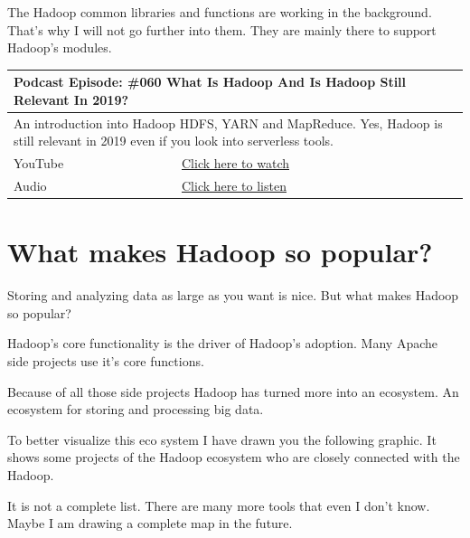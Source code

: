 \documentclass[12pt, numbers=noenddot]{scrreprt} %
\begin{document}
The Hadoop common libraries and functions are working in the background. That’s why I will not go further into them. They are mainly there to support Hadoop’s modules.

\begin{table}[h]
\begin{tabular}{ll}
\hline
\multicolumn{2}{l}{\textbf{Podcast Episode:} \#060 What Is Hadoop And Is Hadoop Still Relevant In 2019?} \\ \hline
\multicolumn{2}{p{15cm}}{An introduction into Hadoop HDFS, YARN and MapReduce. Yes, Hadoop is still relevant in 2019 even if you look into serverless tools. }         \\ \hline
\multicolumn{1}{l|}{YouTube}   & \href{https://youtu.be/8AWaht3YQgo}{Click here to watch}   \\
\multicolumn{1}{l|}{Audio}     & \href{https://anchor.fm/andreaskayy/episodes/060-What-Is-Hadoop-And-Is-Hadoop-Still-Relevant-In-2019-e45ijp}{Click here to listen}   \\ \hline
\end{tabular}
\end{table}

\section{What makes Hadoop so popular?}
Storing and analyzing data as large as you want is nice. But what makes Hadoop so popular?

Hadoop’s core functionality is the driver of Hadoop’s adoption. Many Apache side projects use it’s core functions.

Because of all those side projects Hadoop has turned more into an ecosystem. An ecosystem for storing and processing big data.

To better visualize this eco system I have drawn you the following graphic. It shows some projects of the Hadoop ecosystem who are closely connected with the Hadoop.

It is not a complete list. There are many more tools that even I don’t know. Maybe I am drawing a complete map in the future.
\end{document}
